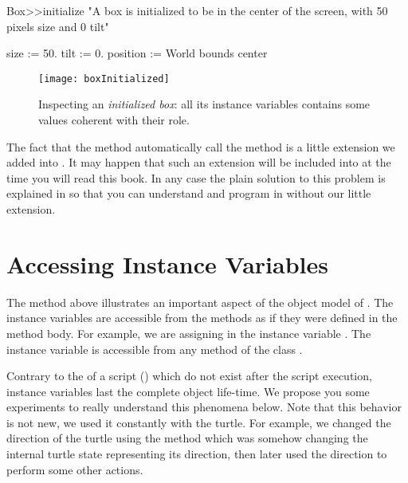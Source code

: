 \begin{method}\label{mt:boxInitialize}
Box>>initialize
   "A box is initialized to be in the center of the screen, with 
   50 pixels size and 0 tilt"
   
   size := 50.
   tilt := 0.
   position := World bounds center
\end{method}

\begin{figure}
\begin{center}
\texttt{[image: boxInitialized]}
\caption{Inspecting an \emph{initialized box}: all its instance variables 
contains some values coherent with their role.\label{fig:initializedBox}}
\end{center}
\end{figure}

\begin{readerNote}
The fact that the  method automatically call the 
method is a little extension we added into \sq.  It may happen that
such an extension will be included into \sq at the time you will read
this book.  In any case the plain \sq solution to this problem is
explained in  so that you can
understand and program in \sq without our little extension.
\end{readerNote}







\section{Accessing Instance Variables}
The method  above illustrates an important aspect of
the object model of \sq.  The instance variables are accessible from
the methods as if they were defined in the method body. For example, 
we are assigning  in the instance variable . The instance 
variable  is accessible from any method of the class .

Contrary to the   of a
script  () which do not exist after the script execution, instance
variables last the complete object life-time.  We propose you some
experiments to really understand this phenomena below.  Note that this
behavior is not new, we used it constantly with the turtle.  For
example, we changed the direction of the turtle using the method
 which was somehow changing the internal turtle state representing its direction, then later used the direction to perform some other actions.

